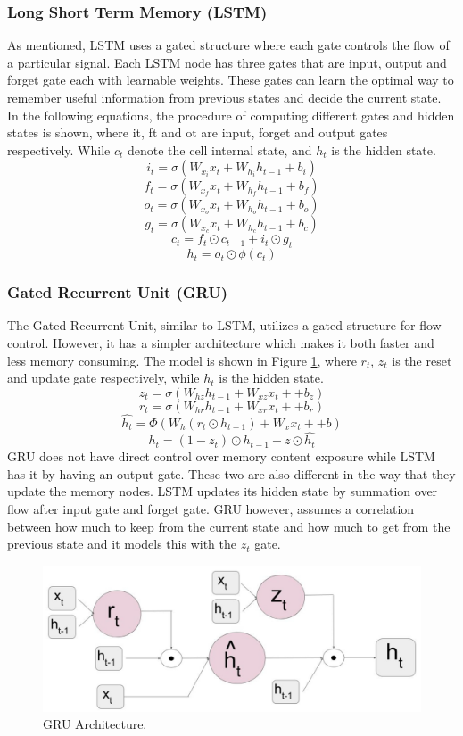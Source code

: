 \documentclass{article}
\begin{document}
\subsubsection{Long Short Term Memory (LSTM)}
\label{long_short_term_memory}
As mentioned, LSTM uses a gated structure where each gate controls the flow of a particular signal. Each LSTM node has three gates that are input, output and forget gate each with learnable weights. These gates can learn the optimal way to remember useful information from previous states and decide the current state.
\\
In the following equations, the procedure of computing different gates and hidden states is shown, where it, ft and ot are input, forget and output gates respectively. While $c_t$ denote the cell internal state, and $h_t$ is the hidden state.
$$i_t = \sigma(W_{x_i} x_t+ W_{h_i} h_{t-1}+b_i)$$
$$f_t = \sigma(W_{x_f} x_t+ W_{h_f} h_{t-1}+b_f)$$
$$o_t = \sigma(W_{x_o} x_t+ W_{h_o} h_{t-1}+b_o)$$
$$g_t = \sigma(W_{x_c} x_t+ W_{h_c} h_{t-1}+b_c)$$
$$c_t = f_t \odot c_{t-1} + i_t \odot g_t$$
$$h_t = o_t \odot \phi(c_t)$$

\subsubsection{Gated Recurrent Unit (GRU)}
\label{gated_recurrent_unit}
The Gated Recurrent Unit, similar to LSTM, utilizes a gated structure for flow-control. However, it has a simpler architecture which makes it both faster and less memory consuming. The model is shown in Figure \ref{fig:gru},  where $r_t$, $z_t$ is the reset and update gate respectively, while $h_t$ is the hidden state.
$$z_t = \sigma(W_{hz} h_{t-1} + W_{xz} x_t+ +b_z)$$
$$r_t = \sigma(W_{hr} h_{t-1} + W_{xr} x_t+ +b_r)$$
$$\hat{h_t} = \Phi (W_{h}( r_t \odot h_{t-1}) + W_x x_t+ +b)$$
$$h_t = (1-z_t)\odot h_{t-1} + z \odot \hat{h_t}$$
GRU does not have direct control over memory content exposure while LSTM has it by having an output gate. These two are also different in the way that they update the memory nodes. LSTM updates its hidden state by summation over flow after input gate and forget gate. GRU however, assumes a correlation between how much to keep from the current state and how much to get from the previous state and it models this with the $z_t$ gate.

\begin{figure}[h]
  \centering
  \includegraphics[scale=0.2]{gru.png} 
  \caption{GRU Architecture. \cite{rFCN}}
  \label{fig:gru}
\end{figure}
\end{document}
